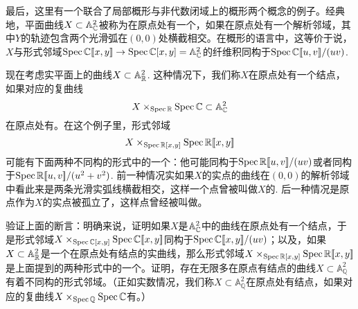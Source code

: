 最后，这里有一个联合了局部概形与非代数闭域上的概形两个概念的例子。经典地，平面曲线$X\subset \mathbb{A}_{\mathbb{C}}^2$被称为在原点处有一个，如果在原点处有一个解析邻域，其中$Y$的轨迹包含两个光滑弧在$(0,0)$处横截相交。在概形的语言中，这等价于说，$X$与形式邻域$\operatorname{Spec} \mathbb{C}[\![x,y]\!]\to \operatorname{Spec} \mathbb{C}[x,y]=\mathbb{A}_{\mathbb{C}}^2$的纤维积同构于$\operatorname{Spec} \mathbb{C}[\![u,v]\!]/(uv)$.

现在考虑实平面上的曲线$X\subset \mathbb{A}_{\mathbb{R}}^2$. 这种情况下，我们称$X$在原点处有一个结点，如果对应的复曲线
\[
	X\times_{\operatorname{Spec} \mathbb{R}}\operatorname{Spec} \mathbb{C} \subset \mathbb{A}_{\mathbb{C}}^2
\]
在原点处有。在这个例子里，形式邻域
\[
	X\times_{\operatorname{Spec} \mathbb{R}[x,y]}\operatorname{Spec} \mathbb{R}[\![x,y]\!]
\]
可能有下面两种不同构的形式中的一个：他可能同构于$\operatorname{Spec} \mathbb{R}[\![u,v]\!]/(uv)$或者同构于$\operatorname{Spec} \mathbb{R}[\![u,v]\!]/(u^2+v^2)$. 前一种情况实如果$X$的实点的曲线在$(0,0)$的解析邻域中看此来是两条光滑实弧线横截相交，这样一个点曾被叫做$X$的. 后一种情况是原点作为$X$的实点被孤立了，这样点曾经被叫做。

\begin{exe}
	验证上面的断言：明确来说，证明如果$X$是$\mathbb{A}_{\mathbb{C}}^2$中的曲线在原点处有一个结点，于是形式邻域$X\times_{\operatorname{Spec} \mathbb{C}[x,y]}\operatorname{Spec} \mathbb{C}[\![x,y]\!]$同构于$\operatorname{Spec}\mathbb{C}[\![x,y]\!]/(uv)$；以及，如果$X\subset \mathbb{A}_{\mathbb{R}}^2$是一个在原点处有结点的实曲线，那么形式邻域$X\times_{\operatorname{Spec} \mathbb{R}[x,y]}\operatorname{Spec} \mathbb{R}[\![x,y]\!]$是上面提到的两种形式中的一个。证明，存在无限多在原点有结点的曲线$X\subset \mathbb{A}_{\mathbb{Q}}^2$有着不同构的形式邻域。（正如实数情况，我们称$X\subset \mathbb{A}^2_\mathbb{Q}$在原点处有结点，如果对应的复曲线$X\times_{\operatorname{Spec} \mathbb{Q}} \operatorname{Spec} \mathbb{C}$有。）
\end{exe}